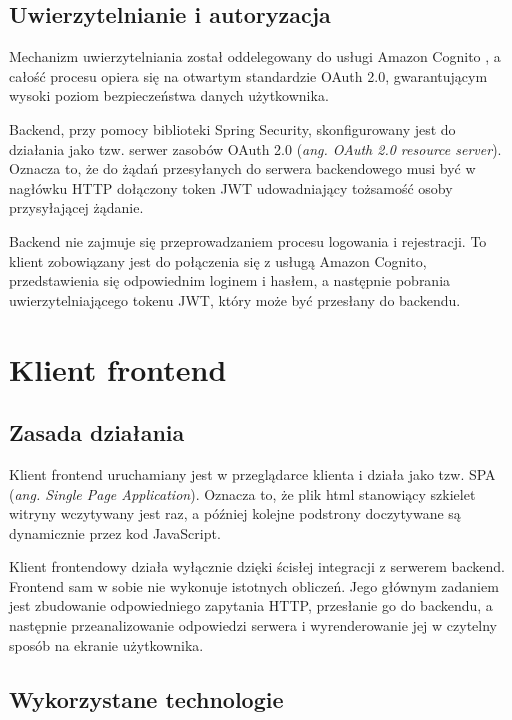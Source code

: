 \subsection{Uwierzytelnianie i autoryzacja}
\label{subsection:authn_authz}

Mechanizm uwierzytelniania został oddelegowany do usługi Amazon Cognito \cite{amazon_cognito_docs}, a całość procesu opiera się na otwartym standardzie OAuth 2.0, gwarantującym wysoki poziom bezpieczeństwa danych użytkownika. \cite{spring_security_in-action}

Backend, przy pomocy biblioteki Spring Security, skonfigurowany jest do działania jako tzw. serwer zasobów OAuth 2.0 (\textit{ang. OAuth 2.0 resource server}). Oznacza to, że do żądań przesyłanych do serwera backendowego musi być w nagłówku HTTP dołączony token JWT udowadniający tożsamość osoby przysyłającej żądanie. \cite{spring_security_in-action}

Backend nie zajmuje się przeprowadzaniem procesu logowania i rejestracji. To klient zobowiązany jest do połączenia się z usługą Amazon Cognito, przedstawienia się odpowiednim loginem i hasłem, a następnie pobrania uwierzytelniającego tokenu JWT, który może być przesłany do backendu.

\section{Klient frontend}

\subsection{Zasada działania}

Klient frontend uruchamiany jest w przeglądarce klienta i działa jako tzw. SPA (\textit{ang. Single Page Application}). Oznacza to, że plik html stanowiący szkielet witryny wczytywany jest raz, a później kolejne podstrony doczytywane są dynamicznie przez kod JavaScript. \cite{angular_official_docs}

Klient frontendowy działa wyłącznie dzięki ścisłej integracji z serwerem backend. Frontend sam w sobie nie wykonuje istotnych obliczeń. Jego głównym zadaniem jest zbudowanie odpowiedniego zapytania HTTP, przesłanie go do backendu, a następnie przeanalizowanie odpowiedzi serwera i wyrenderowanie jej w czytelny sposób na ekranie użytkownika. 

\subsection{Wykorzystane technologie}

